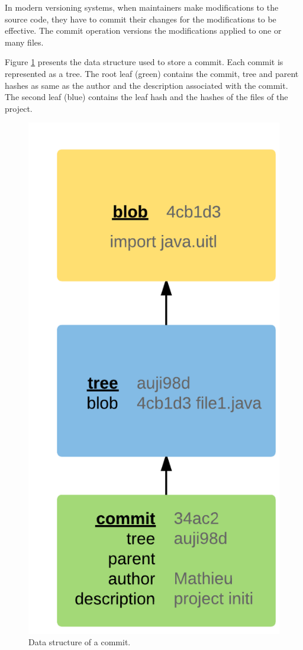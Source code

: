 In modern versioning systems, when maintainers make modifications to the source code,  they have to  commit their changes for the modifications to be effective. The commit operation versions the modifications applied to one or many files.

Figure \ref{fig:branching} presents the data structure used to store a commit.
Each commit is represented as a tree.
The root leaf (green) contains the commit, tree and parent hashes as same as the author and the description associated with the commit.
The second leaf (blue) contains the leaf hash and the hashes of the files of the project.

\begin{figure}[h!]
  \centering
    \includegraphics[scale=0.25]{media/commit-datastructure.png}
    \caption{Data structure of a commit.
    \label{fig:branching}}
\end{figure}

